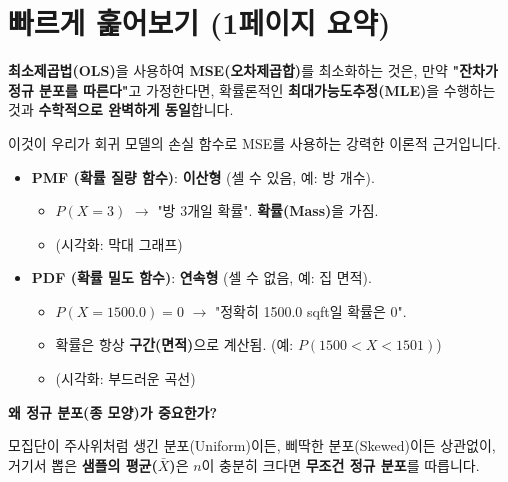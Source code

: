\documentclass[11pt,a4paper]{book}
\theoremstyle{definition}
\begin{document}
\part{빠르게 훑어보기 (1페이지 요약)}
\label{part:summary}

\begin{tcolorbox}[colback=yellow!5!white, colframe=yellow!75!black, title={1. 핵심 연결: OLS = MLE (가장 중요한 결론)}]
\textbf{최소제곱법(OLS)}을 사용하여 \textbf{MSE(오차제곱합)}를 최소화하는 것은,
만약 \textbf{"잔차가 정규 분포를 따른다"}고 가정한다면,
확률론적인 \textbf{최대가능도추정(MLE)}을 수행하는 것과
\textbf{수학적으로 완벽하게 동일}합니다.

이것이 우리가 회귀 모델의 손실 함수로 MSE를 사용하는 강력한 이론적 근거입니다.
\end{tcolorbox}

\begin{tcolorbox}[colback=blue!5!white, colframe=blue!75!black, title={2. PMF vs. PDF (핵심 구분)}]
\begin{itemize}
    \item \textbf{PMF (확률 질량 함수)}: \textbf{이산형} (셀 수 있음, 예: 방 개수).
    \begin{itemize}
        \item $P(X=3)$ $\to$ "방 3개일 확률". \textbf{확률(Mass)}을 가짐.
        \item (시각화: 막대 그래프)
    \end{itemize}
    \item \textbf{PDF (확률 밀도 함수)}: \textbf{연속형} (셀 수 없음, 예: 집 면적).
    \begin{itemize}
        \item $P(X=1500.0) = 0$ $\to$ "정확히 1500.0 sqft일 확률은 0".
        \item 확률은 항상 \textbf{구간(면적)}으로 계산됨. (예: $P(1500 < X < 1501)$)
        \item (시각화: 부드러운 곡선)
    \end{itemize}
\end{itemize}
\end{tcolorbox}

\begin{tcolorbox}[colback=gray!10!white, colframe=black, title={3. 중심극한정리 (CLT)}]
\textbf{왜 정규 분포(종 모양)가 중요한가?}

모집단이 주사위처럼 생긴 분포(Uniform)이든, 삐딱한 분포(Skewed)이든 상관없이,
거기서 뽑은 \textbf{샘플의 평균($\bar{X}$)}은
$n$이 충분히 크다면 \textbf{무조건 정규 분포}를 따릅니다.
\end{tcolorbox}
\end{document}
